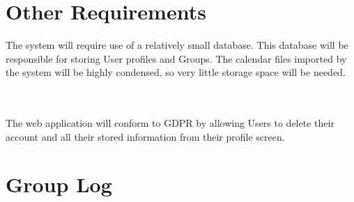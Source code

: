 \documentclass{scrreprt}
\begin{document}
\chapter{Other Requirements}
The system will require use of a relatively small database. This database will be responsible for storing User profiles and Groups. The calendar files imported by the system will be highly condensed, so very little storage space will be needed.

\\\\The web application will conform to GDPR by allowing Users to delete their account and all their stored information from their profile screen.

\appendix

\chapter{Group Log}
\end{document}
